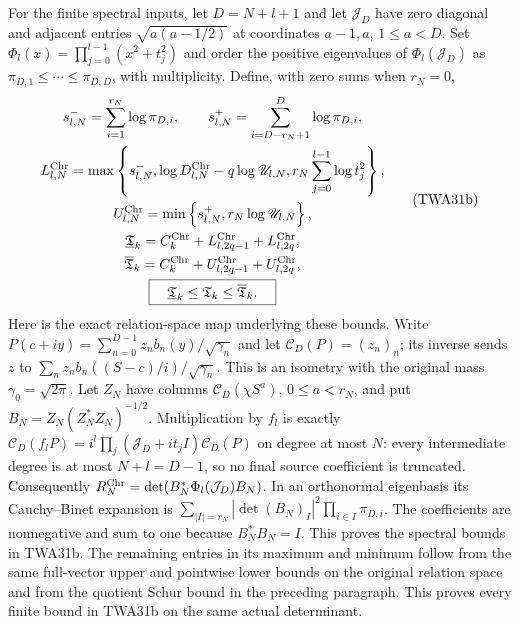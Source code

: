 For the finite spectral inputs, let $D=N+l+1$ and let
$\mathcal J_D$ have zero diagonal and adjacent entries
$\sqrt{a(a-1/2)}$ at coordinates $a-1,a$, $1\leq a<D$.
Set $\Phi_l(x)=\prod_{j=0}^{l-1}(x^2+t_j^2)$ and order the
positive eigenvalues of $\Phi_l(\mathcal J_D)$ as
$\pi_{D,1}\leq\cdots\leq\pi_{D,D}$, with multiplicity.
Define, with zero sums when $r_N=0$,
\[
\begin{gathered}
 s^-_{l,N}=\sum_{i=1}^{r_N}\log\pi_{D,i},\qquad
 s^+_{l,N}=\sum_{i=D-r_N+1}^{D}\log\pi_{D,i},\\
 L_{l,N}^{\rm Chr}=\max\left\{s^-_{l,N},
    \log D_{l,N}^{\rm Chr}-q\log\mathscr U_{l,N},
    r_N\sum_{j=0}^{l-1}\log t_j^2\right\},\\
 U_{l,N}^{\rm Chr}=\min\left\{s^+_{l,N},
                                    r_N\log\mathscr U_{l,N}\right\},\\
 \underline{\mathfrak T}_k=C_k^{\rm Chr}
               +L_{l,2q-1}^{\rm Chr}+L_{l,2q}^{\rm Chr},\\
 \overline{\mathfrak T}_k=C_k^{\rm Chr}
               +U_{l,2q-1}^{\rm Chr}+U_{l,2q}^{\rm Chr},\\
 \boxed{\quad\underline{\mathfrak T}_k\leq\mathfrak T_k
                  \leq\overline{\mathfrak T}_k.\quad}
\end{gathered}\tag{TWA31b}
\]
Here is the exact relation-space map underlying these bounds.
Write $P(c+iy)=\sum_{n=0}^{D-1}z_nb_n(y)/\sqrt{\gamma_n}$
and let $\mathcal C_D(P)=(z_n)_n$; its inverse sends $z$ to
$\sum_nz_nb_n((S-c)/i)/\sqrt{\gamma_n}$.
This is an isometry with the original mass $\gamma_0=\sqrt{2\pi}$.
Let $Z_N$ have columns $\mathcal C_D(\chi S^a)$,
$0\leq a<r_N$, and put $B_N=Z_N(Z_N^*Z_N)^{-1/2}$.
Multiplication by $f_l$ is exactly
$\mathcal C_D(f_lP)=i^l\prod_j(\mathcal J_D+it_jI)\mathcal C_D(P)$
on degree at most $N$: every intermediate degree is at most
$N+l=D-1$, so no final source coefficient is truncated.
Consequently
$R_N^{\rm Chr}=\det(B_N^*\Phi_l(\mathcal J_D)B_N)$.
In an orthonormal eigenbasis its Cauchy--Binet expansion is
$\sum_{|I|=r_N}|\det(B_N)_I|^2\prod_{i\in I}\pi_{D,i}$.
The coefficients are nonnegative and sum to one because
$B_N^*B_N=I$. This proves the spectral bounds in TWA31b.
The remaining entries in its maximum and minimum follow
from the same full-vector upper and pointwise lower bounds
on the original relation space and from the quotient Schur
bound in the preceding paragraph. This proves every finite
bound in TWA31b on the same actual determinant.


